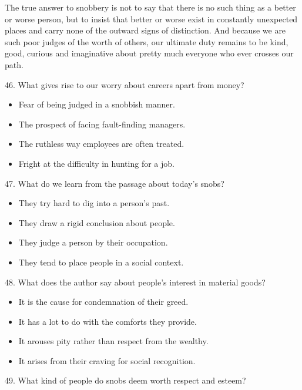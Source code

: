 \documentclass[UTF8,11pt]{ctexart}
\begin{document}
The true answer to snobbery is not to say that there is no such thing as a better or worse person, but to insist that better or worse exist in constantly unexpected places and carry none of the outward signs of distinction. And because we are such poor judges of the worth of others, our ultimate duty remains to be kind, good, curious and imaginative about pretty much everyone who ever crosses our path.


46. What gives rise to our worry about careers apart from money?


\begin{itemize}[leftmargin=2em,itemsep=.2em,topsep=.4em]\item[A.] Fear of being judged in a snobbish manner.
\item[B.] The prospect of facing fault-finding managers.
\item[C.] The ruthless way employees are often treated.
\item[D.] Fright at the difficulty in hunting for a job.
\end{itemize}

47. What do we learn from the passage about today’s snobs?


\begin{itemize}[leftmargin=2em,itemsep=.2em,topsep=.4em]\item[A.] They try hard to dig into a person’s past.
\item[B.] They draw a rigid conclusion about people.
\item[C.] They judge a person by their occupation.
\item[D.] They tend to place people in a social context.
\end{itemize}

48. What does the author say about people’s interest in material goods?


\begin{itemize}[leftmargin=2em,itemsep=.2em,topsep=.4em]\item[A.] It is the cause for condemnation of their greed.
\item[B.] It has a lot to do with the comforts they provide.
\item[C.] It arouses pity rather than respect from the wealthy.
\item[D.] It arises from their craving for social recognition.
\end{itemize}

49. What kind of people do snobs deem worth respect and esteem?
\end{document}
